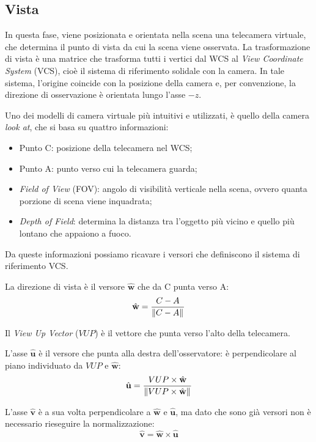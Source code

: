\subsection{Vista}
\label{subsec:vista}
In questa fase, viene posizionata e orientata nella scena una telecamera virtuale, che determina il punto di vista da cui la scena viene osservata.
La trasformazione di vista è una matrice che trasforma tutti i vertici dal WCS al \emph{View Coordinate System} (VCS), cioè il sistema di riferimento solidale con la camera.
In tale sistema, l’origine coincide con la posizione della camera e, per convenzione, la direzione di osservazione è orientata lungo l’asse $-z$.

Uno dei modelli di camera virtuale più intuitivi e utilizzati, è quello della camera \emph{look at}, che si basa su quattro informazioni:
\begin{itemize}
    \item Punto C: posizione della telecamera nel WCS;
    \item Punto A: punto verso cui la telecamera guarda;
    \item \emph{Field of View} (FOV): angolo di visibilità verticale nella scena, ovvero quanta porzione di scena viene inquadrata;
    \item \emph{Depth of Field}: determina la distanza tra l'oggetto più vicino e quello più lontano che appaiono a fuoco.
\end{itemize}
Da queste informazioni possiamo ricavare i versori che definiscono il sistema di riferimento VCS.

La direzione di vista è il versore $\hat{\mathbf{w}}$ che da C punta verso A:
\[
    \hat{\mathbf{w}} = \frac{C - A}{\left\|C - A\right\|_{}}
\]

Il \emph{View Up Vector} ($VUP$) è il vettore che punta verso l'alto della telecamera.

L'asse $\hat{\mathbf{u}}$ è il versore che punta alla destra dell'osservatore: è perpendicolare al piano individuato da $VUP$ e $\hat{\mathbf{w}}$:
\[
    \hat{\mathbf{u}} = \frac{VUP \times \hat{\mathbf{w}}}{\left\|VUP \times \hat{\mathbf{w}}\right\|_{}}
\]

L'asse $\hat{\mathbf{v}}$ è a sua volta perpendicolare a $\hat{\mathbf{w}}$ e $\hat{\mathbf{u}}$, ma dato che sono già versori non è necessario rieseguire la normalizzazione:
\[
    \hat{\mathbf{v}} = \hat{\mathbf{w}} \times \hat{\mathbf{u}}
\]

